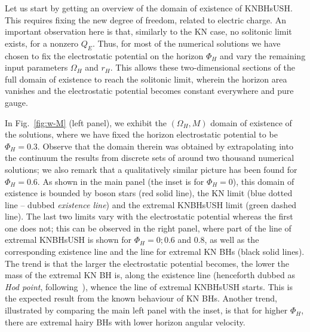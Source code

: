 Let us start by getting an overview of the domain of existence of KNBHsUSH. 
This requires fixing the new degree of freedom, related to electric charge. 
An important observation here is that, similarly to the
KN case, no solitonic limit exists, for a nonzero $Q_E$.
Thus, for most of the numerical solutions we have chosen to fix the electrostatic potential on the horizon $\Phi_H$
and vary the remaining  input parameters $\Omega_H$ and $r_H$.
This allows these  two-dimensional sections of the full domain of existence to reach the solitonic limit, 
wherein the horizon area vanishes and the electrostatic potential becomes constant everywhere and pure gauge.


 In Fig.~\ref{fig:w-M} (left panel), 
we exhibit the $(\Omega_H,M)$ domain of existence of the solutions, where we have fixed the horizon electrostatic potential to be $\Phi_H=0.3$. Observe that the domain therein was obtained by extrapolating into the continuum
the results from discrete sets of around two thousand numerical solutions; we also remark that a qualitatively similar picture has been found for $\Phi_H=0.6$.
 As shown in the main panel (the inset is for $\Phi_H=0$), 
this domain of existence is bounded by boson stars (red solid line), 
the KN limit (blue dotted line -- dubbed \textit{existence line}) 
and the extremal KNBHsUSH limit (green dashed line). 
The last two limits vary with the electrostatic potential whereas the first one does not; 
this can be observed in the right panel, where part of the line of extremal KNBHsUSH is shown for $\Phi_H=0; 0.6$ and $0.8$, as well as the corresponding existence line and the line for extremal KN BHs (black solid lines). 
The trend is that the larger the electrostatic potential becomes, the lower the mass of the extremal KN BH is, along the existence line (henceforth dubbed as \textit{Hod point}, following~\cite{Herdeiro:2015tia}), whence the line of extremal KNBHsUSH starts. This is the expected result from the known behaviour of KN BHs. Another trend, illustrated by comparing the main left panel with the inset, is that for higher $\Phi_H$, there are extremal hairy BHs with lower horizon angular velocity.

